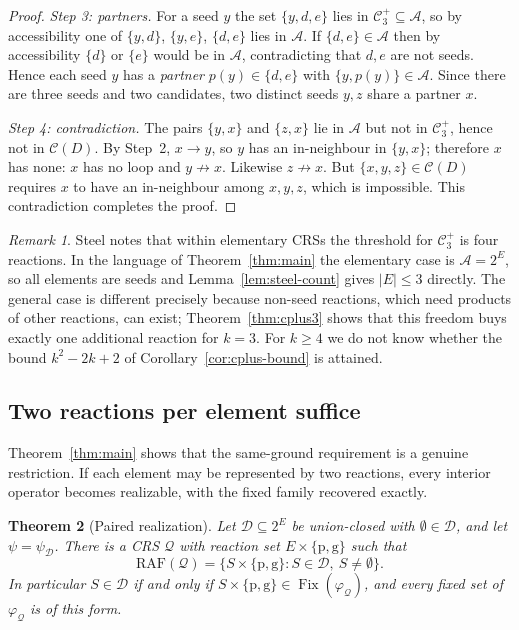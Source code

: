 \documentclass[11pt,a4paper]{article}
\theoremstyle{plain}
\newtheorem{theorem}{Theorem}[section]
\theoremstyle{definition}
\theoremstyle{remark}
\newtheorem{remark}[theorem]{Remark}
\newcommand{\Fix}{\operatorname{Fix}}
\newcommand{\RAF}{\mathrm{RAF}}
\newcommand{\cA}{\mathcal{A}}
\newcommand{\cC}{\mathcal{C}}
\newcommand{\cD}{\mathcal{D}}
\newcommand{\cQ}{\mathcal{Q}}
\newcommand{\pw}[1]{2^{#1}}
\newcommand{\Cplus}[1]{\cC^{+}_{#1}}
\begin{document}
\begin{proof}
\emph{Step 3: partners.} For a seed $y$ the set $\{y,d,e\}$ lies in $\Cplus{3}\subseteq\cA$, so by accessibility one of $\{y,d\}$, $\{y,e\}$, $\{d,e\}$ lies in $\cA$. If $\{d,e\}\in\cA$ then by accessibility $\{d\}$ or $\{e\}$ would be in $\cA$, contradicting that $d,e$ are not seeds. Hence each seed $y$ has a \emph{partner} $p(y)\in\{d,e\}$ with $\{y,p(y)\}\in\cA$. Since there are three seeds and two candidates, two distinct seeds $y,z$ share a partner $x$.

\emph{Step 4: contradiction.} The pairs $\{y,x\}$ and $\{z,x\}$ lie in $\cA$ but not in $\Cplus{3}$, hence not in $\cC(D)$. By Step~2, $x\to y$, so $y$ has an in-neighbour in $\{y,x\}$; therefore $x$ has none: $x$ has no loop and $y\not\to x$. Likewise $z\not\to x$. But $\{x,y,z\}\in\cC(D)$ requires $x$ to have an in-neighbour among $x,y,z$, which is impossible. This contradiction completes the proof.
\end{proof}

\begin{remark}
Steel notes that within elementary CRSs the threshold for $\Cplus{3}$ is four reactions. In the language of Theorem~\ref{thm:main} the elementary case is $\cA=\pw{E}$, so all elements are seeds and Lemma~\ref{lem:steel-count} gives $|E|\le3$ directly. The general case is different precisely because non-seed reactions, which need products of other reactions, can exist; Theorem~\ref{thm:cplus3} shows that this freedom buys exactly one additional reaction for $k=3$. For $k\ge4$ we do not know whether the bound $k^2-2k+2$ of Corollary~\ref{cor:cplus-bound} is attained.
\end{remark}

\subsection{Two reactions per element suffice}\label{sec:pair}

Theorem~\ref{thm:main} shows that the same-ground requirement is a genuine restriction. If each element may be represented by two reactions, every interior operator becomes realizable, with the fixed family recovered exactly.

\begin{theorem}[Paired realization]\label{thm:pair}
Let $\cD\subseteq\pw{E}$ be union-closed with $\emptyset\in\cD$, and let $\psi=\psi_{\cD}$. There is a CRS $\cQ$ with reaction set $E\times\{\mathrm{p},\mathrm{g}\}$ such that
\[
\RAF(\cQ)=\bigl\{S\times\{\mathrm{p},\mathrm{g}\}: S\in\cD,\ S\neq\emptyset\bigr\}.
\]
In particular $S\in\cD$ if and only if $S\times\{\mathrm{p},\mathrm{g}\}\in\Fix(\varphi_{\cQ})$, and every fixed set of $\varphi_{\cQ}$ is of this form.
\end{theorem}
\end{document}
